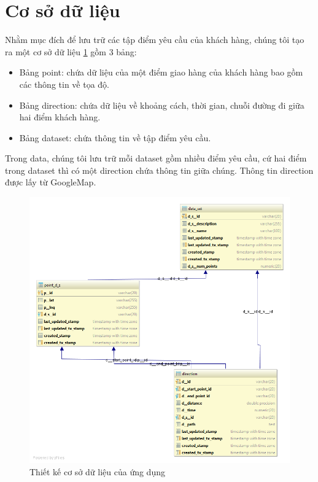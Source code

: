 \documentclass[a4paper,12pt]{report}
\begin{document}
\section{Cơ sở dữ liệu}
Nhằm mục đích để lưu trữ các tập điểm yêu cầu của khách hàng, chúng tôi tạo ra một cơ sở dữ liệu \ref{database} gồm 3 bảng: 
\begin{itemize}
\item Bảng point: chứa dữ liệu của một điểm giao hàng của khách hàng bao gồm các thông tin về tọa độ.
\item Bảng direction: chứa dữ liệu về khoảng cách, thời gian, chuỗi đường đi giữa hai điểm khách hàng.
\item Bảng dataset: chứa thông tin về tập điểm yêu cầu.
\end{itemize}
Trong data, chúng tôi lưu trữ mỗi dataset gồm nhiều điểm yêu cầu, cứ hai điểm trong dataset thì có một direction chứa thông tin giữa chúng. Thông tin direction được lấy từ GoogleMap.
\begin{figure}

\includegraphics[scale=0.6]{database.png}
\caption{Thiết kế cơ sở dữ liệu của ứng dụng}
\label{database}
\end{figure}
\end{document}
